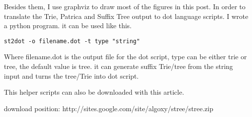 \documentclass{article}
\begin{document}
Besides them, I use graphviz to draw most of the figures in this post. In order to
translate the Trie, Patrica and Suffix Tree output to dot language scripts. I wrote a python program.
it can be used like this.

\begin{verbatim}
st2dot -o filename.dot -t type "string"
\end{verbatim}

Where filename.dot is the output file for the dot script, type can be
either trie or tree, the default value is tree. it can generate suffix
Trie/tree from the string input and turns the tree/Trie into dot script.

This helper scripts can also be downloaded with this article.

download position: http://sites.google.com/site/algoxy/stree/stree.zip
\end{document}
